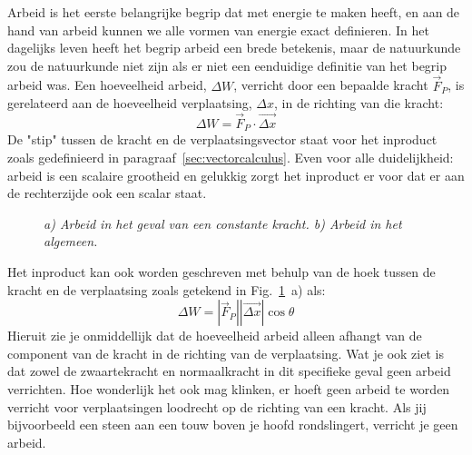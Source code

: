 Arbeid is het eerste belangrijke begrip dat met energie te maken heeft, en aan de hand van
arbeid kunnen we alle vormen van energie exact definieren. In het dagelijks leven heeft het 
begrip arbeid een brede betekenis, maar de natuurkunde zou de natuurkunde niet zijn als
er niet een eenduidige definitie van het begrip arbeid was. Een hoeveelheid arbeid, $\Delta W$,
verricht door een bepaalde kracht $\vec{F}_P$, is gerelateerd aan de hoeveelheid 
verplaatsing, $\Delta x$, in de richting van die kracht:
\begin{equation} 
\Delta W = \vec{F}_P\cdot\vec{\Delta x} 
\end{equation}
De "stip" tussen de kracht en de verplaatsingsvector staat voor het inproduct zoals gedefinieerd
in paragraaf~\ref{sec:vectorcalculus}. Even voor alle duidelijkheid: arbeid is een scalaire grootheid
en gelukkig zorgt het inproduct er voor dat er aan de rechterzijde ook een scalar staat. 
 \begin{figure}[htbp]
\begin{center}
\caption{{\it a) Arbeid in het geval van een constante kracht. b) Arbeid in het algemeen.}}
\label{fig:W}
\end{center}
\end{figure} 
Het inproduct kan ook worden geschreven met behulp van de hoek tussen de kracht en
de verplaatsing zoals getekend in Fig.~\ref{fig:W}~a) als:
\begin{equation}
\Delta W = |\vec{F}_P||\vec{\Delta x}|\cos\theta
\end{equation}
Hieruit zie je onmiddellijk dat de hoeveelheid arbeid alleen afhangt van de component
van de kracht in de richting van de verplaatsing. Wat je ook ziet is dat zowel de zwaartekracht
en normaalkracht in dit specifieke geval geen arbeid verrichten. Hoe wonderlijk het ook 
mag klinken, er hoeft geen arbeid te worden verricht voor verplaatsingen loodrecht op de 
richting van een kracht. Als jij bijvoorbeeld een steen aan een touw boven je hoofd rondslingert, 
verricht je geen arbeid. 

